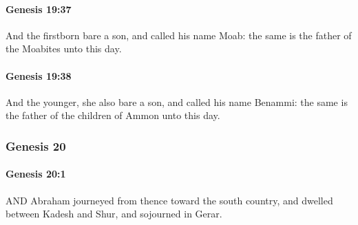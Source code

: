 		\paragraph{Genesis 19:37} %
			\label{GENESIS-19-37}

			And the firstborn bare a son, and called his name Moab: the same is the father of the Moabites unto this day.


		\paragraph{Genesis 19:38} %
			\label{GENESIS-19-38}

			And the younger, she also bare a son, and called his name Benammi: the same is the father of the children of Ammon unto this day.


	\subsubsection{Genesis 20} %
		\label{GENESIS-20}
		
		\paragraph{Genesis 20:1} %
			\label{GENESIS-20-1}

			AND Abraham journeyed from thence toward the south country, and dwelled between Kadesh and Shur, and sojourned in Gerar.

